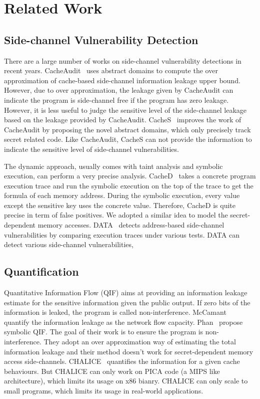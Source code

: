 \section{Related Work}


\subsection{Side-channel Vulnerability Detection}

There are a large number of works on side-channel vulnerability detections in recent years.
CacheAudit~\cite{182946} uses abstract domains to compute the over approximation of cache-based
side-channel information leakage upper bound. However, due to over approximation, the leakage
given by CacheAudit can indicate the program is side-channel free if the program has zero leakage. 
However, it is less useful to judge the sensitive level of the side-channel leakage based on the
leakage provided by CacheAudit. CacheS~\cite{236338} improves the work of CacheAudit by proposing 
the novel abstract domains, which only precisely track secret related code. Like CacheAudit, CacheS
can not provide the information to indicate the sensitive level of side-channel vulnerabilities.

The dynamic approach, usually comes with taint analysis and symbolic execution, can perform a very 
precise analysis. CacheD~\cite{203878} takes a concrete program execution trace and run the symbolic
execution on the top of the trace to get the formula of each memory address. During the symbolic
execution, every value except the sensitive key uses the concrete value. Therefore, CacheD is quite 
precise in term of false positives. We adopted a similar idea to model the secret-dependent memory 
accesses. DATA~\cite{217537} detects address-based side-channel vulnerabilities by comparing 
execution traces under various tests. DATA can detect various side-channel vulnerabilities, 

\subsection{Quantification}
Quantitative Information Flow (QIF) aims at providing an information leakage estimate for the
sensitive information given the public output. If zero bits of the information is leaked, the 
program is called non-interference. McCamant~\cite{McCamantE2008} quantify the information leakage
as the network flow capacity. Phan~\cite{Phan:2012:SQI:2382756.2382791} propose symbolic QIF. The
goal of their work is to ensure the program is non-interference. They adopt an over
approximation way of estimating the total information leakage and their method doesn't work for
secret-dependent memory access side-channels. CHALICE~\cite{Chattopadhyay:2017:QIL:3127041.3127044}
quantifies the information for a given cache behaviours. But CHALICE can only 
work on PICA code (a MIPS like architecture), which limits its usage on x86 bianry. 
CHALICE can only scale to small programs, which limits its usage in
real-world applications.
